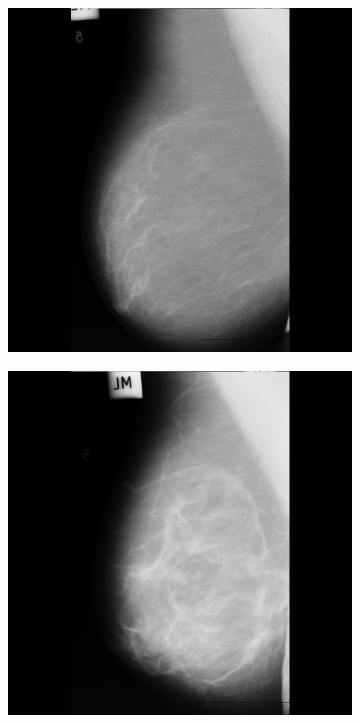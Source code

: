 \begin{figure}[!ht]
  \center
  \begin{subfigure}[ht!]{0.2\textwidth}
        \includegraphics[width=\textwidth]{Chapter1/background-img/a.png}
        \caption{}
        \label{fig:birads-a}
    \end{subfigure}
    \begin{subfigure}[ht!]{0.2\textwidth}
          \includegraphics[width=\textwidth]{Chapter1/background-img/b.png}

\end{subfigure}
\end{figure}
